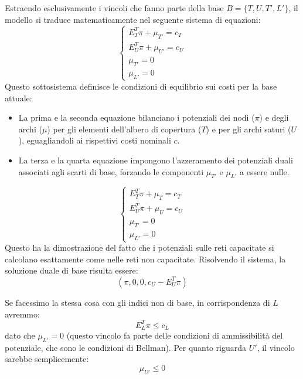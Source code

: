 \documentclass[12pt, a4paper]{article}
\begin{document}
	Estraendo esclusivamente i vincoli che fanno parte della base $B = \{T, U, T', L'\}$, il modello si traduce matematicamente nel seguente sistema di equazioni:
	\[
	\begin{cases}
		E_T^T \pi + \mu_{T'} = c_T \\
		E_U^T \pi + \mu_{U'} = c_U \\
		\mu_{T'} = 0 \\
		\mu_{L'} = 0
	\end{cases}
	\]
	Questo sottosistema definisce le condizioni di equilibrio sui costi per la base attuale:
	\begin{itemize}
		\item La prima e la seconda equazione bilanciano i potenziali dei nodi ($\pi$) e degli archi ($\mu$) per gli elementi dell'albero di copertura ($T$) e per gli archi saturi ($U$), eguagliandoli ai rispettivi costi nominali $c$.
		\item La terza e la quarta equazione impongono l'azzeramento dei potenziali duali associati agli scarti di base, forzando le componenti $\mu_{T'}$ e $\mu_{L'}$ a essere nulle.
	\end{itemize}
	\[
	\begin{cases}
		E_T^T \pi + \mu_{T} = c_T \\
		E_U^T \pi + \mu_{U} = c_U \\
		\mu_{T'} = 0 \\
		\mu_{L'} = 0
	\end{cases}
	\]
	Questo ha la dimostrazione del fatto che i potenziali sulle reti capacitate si calcolano esattamente come nelle reti non capacitate. Risolvendo il sistema, la soluzione duale di base risulta essere:
	\[
	(\pi, 0, 0, c_U - E_U^T \pi)
	\]
	
	Se facessimo la stessa cosa con gli indici non di base, in corrispondenza di $L$ avremmo:
	\[
	E_L^T \pi \le c_L
	\]
	dato che $\mu_{L'} = 0$ (questo vincolo fa parte delle condizioni di ammissibilità del potenziale, che sono le condizioni di Bellman). Per quanto riguarda $U'$, il vincolo sarebbe semplicemente:
	\[
	\mu_{U'} \le 0
	\]
	
\end{document}
